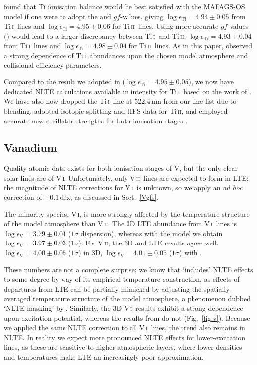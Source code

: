 \documentclass[traditabstract]{aa}
\newcommand{\alttii}{Ti\,\textsc{i}}
\newcommand{\alttiii}{Ti\,\textsc{ii}}
\newcommand{\altvi}{V\,\textsc{i}}
\newcommand{\altvii}{V\,\textsc{ii}}
\newcommand{\tii}{\alttii\ }
\newcommand{\tiii}{\alttiii\ }
\newcommand{\vi}{\altvi\ }
\newcommand{\vii}{\altvii\ }
\begin{document}
\citet{Bergemann11} found that Ti ionisation balance would be best satisfied with the MAFAGS-OS model if one were to adopt the \citet{BW06} and \citet{Pickering01} $gf$-values, giving $\log \epsilon_\mathrm{Ti}=4.94\pm0.05$ from \tii lines and $\log \epsilon_\mathrm{Ti}=4.95\pm0.06$ for \tiii lines.  Using more accurate $gf$-values (\citealt{Bizzarri93}) would lead to a larger discrepancy between \tii and \alttiii: $\log \epsilon_\mathrm{Ti}=4.93\pm0.04$ from \tii lines and $\log\epsilon_\mathrm{Ti}=4.98\pm0.04$ for \tiii lines.  As in this paper, \citet{Bergemann11} observed a strong dependence of \tii abundances upon the chosen model atmosphere and collisional efficiency parameters.

Compared to the result we adopted in  ($\log \epsilon_\mathrm{Ti}=4.95\pm0.05$), we now have dedicated NLTE calculations available in intensity for \tii based on the work of \citet{Bergemann11}.  We have also now dropped the \tii line at 522.4\,nm from our line list due to blending, adopted isotopic splitting and HFS data for \alttiii, and employed accurate new oscillator strengths for both ionisation stages \citep{Lawler13, Wood13}.

\subsection{Vanadium}
\label{Vresults}

Quality atomic data exists for both ionisation stages of V, but the only clear solar lines are of \altvi.  Unfortunately, only \vii lines are expected to form in LTE; the magnitude of NLTE corrections for \vi is unknown, so we apply an {\it ad hoc} correction of $+0.1$\,dex, as discussed in Sect.\ \ref{Vgfs}.

The minority species, \altvi, is more strongly affected by the temperature structure of the model atmosphere than \altvii.  The 3D LTE abundance from \vi lines is $\log \epsilon_\mathrm{V}=3.79\pm0.04$ ($1\sigma$ dispersion), whereas with the  model we obtain $\log \epsilon_\mathrm{V}=3.97\pm0.03$ ($1\sigma$).  For \altvii, the 3D and  LTE results agree well: $\log \epsilon_\mathrm{V}=4.00\pm0.05$ ($1\sigma$) in 3D, $\log \epsilon_\mathrm{V}=4.01\pm0.05$ ($1\sigma$) with .  

These numbers are not a complete surprise: we know that  `includes' NLTE effects to some degree by way of its empirical temperature construction, as effects of departures from LTE can be partially mimicked by adjusting the spatially-averaged temperature structure of the model atmosphere, a phenomenon dubbed `NLTE masking' by \citet{1982A&A...115..104R}.  Similarly, the 3D \vi results exhibit a strong dependence upon excitation potential, whereas the results from  do not (Fig.~\ref{fig:v}). Because we applied the same NLTE correction to all \altvi\ lines, the trend also remains in NLTE. In reality we  expect more pronounced NLTE effects for lower-excitation lines, as these are sensitive to higher atmospheric layers, where lower densities and temperatures make LTE an increasingly poor approximation.  
\end{document}
